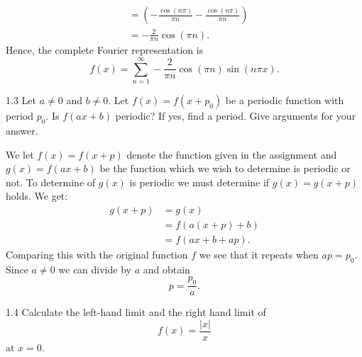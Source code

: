 \begin{derivation}
\begin{enumerate}[label=\alph*)]
\begin{align*}
            &= \left( - \frac{\cos \left( n \pi \right)}{\pi n} - \frac{\cos \left( n\pi \right)}{\pi n} \right) \\
            &= - \frac{2}{\pi n} \cos \left( \pi n \right)
      .\end{align*}
      Hence, the complete Fourier representation is
      \begin{equation*}
        f(x) = \sum_{n = 1}^{\infty}  - \frac{2}{\pi n} \cos \left(\pi n \right) \sin \left( n \pi x \right)
      .\end{equation*}
  \end{enumerate}
\end{derivation}


\begin{problem}{1.3}
  Let $a\neq 0$ and $b\neq 0$.
  Let $f(x) = f(x+p_0)$ be a periodic function with period $p_0$.
  Is $f(ax+b)$ periodic?
  If yes, find a period.
  Give arguments for your answer.
\end{problem}

\begin{derivation}
  We let $f(x) = f(x+p)$ denote the function given in the assignment and $g(x) = f(ax +b)$ be the function which we wish to determine is periodic or not.
  To determine of $g(x)$ is periodic we must determine if $g(x) = g(x+p)$ holds.
  We get:
  \begin{align*}
    g(x + p) &= g(x) \\
    &= f(a(x+p) + b) \\
    &= f(ax + b + ap)
  .\end{align*}
  Comparing this with the original function $f$ we see that it repeats when $ap = p_0$.
  Since $a \neq 0$ we can divide by $a$ and obtain
  \begin{equation*}
    p = \frac{p_0}{a}
  .\end{equation*}
\end{derivation}


\begin{problem}{1.4}
  Calculate the left-hand limit and the right hand limit of
  \begin{equation*}
    f(x) = \frac{|x|}{x}
  \end{equation*}
  at $x = 0$.
\end{problem}

